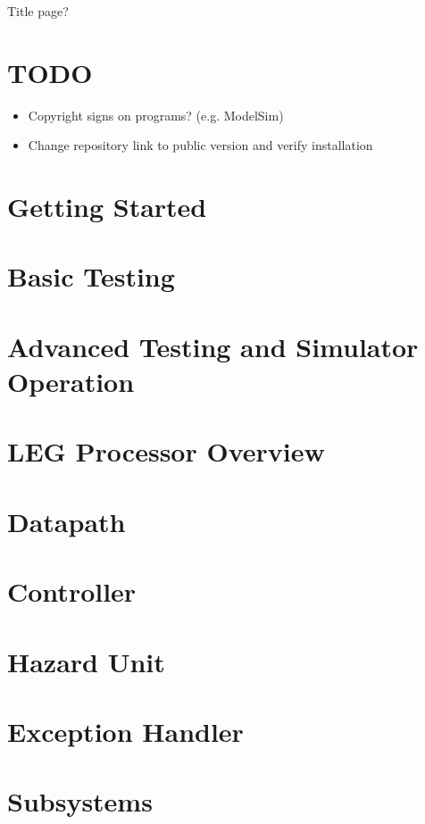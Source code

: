 \documentclass[12pt]{article}
\begin{document}
Title page?
\pagebreak

\tableofcontents
\pagebreak

\section{TODO}
\begin{itemize}
\item Copyright signs on programs? (e.g. ModelSim)
\item Change repository link to public version and verify installation
\end{itemize}

\section{Getting Started}


\section{Basic Testing}

\pagebreak

\section{Advanced Testing and Simulator Operation}

\pagebreak

\section{LEG Processor Overview}


\section{Datapath}


\section{Controller}


\section{Hazard Unit}


\section{Exception Handler}



\section{Subsystems}

\pagebreak


\pagebreak


\pagebreak
\end{document}
